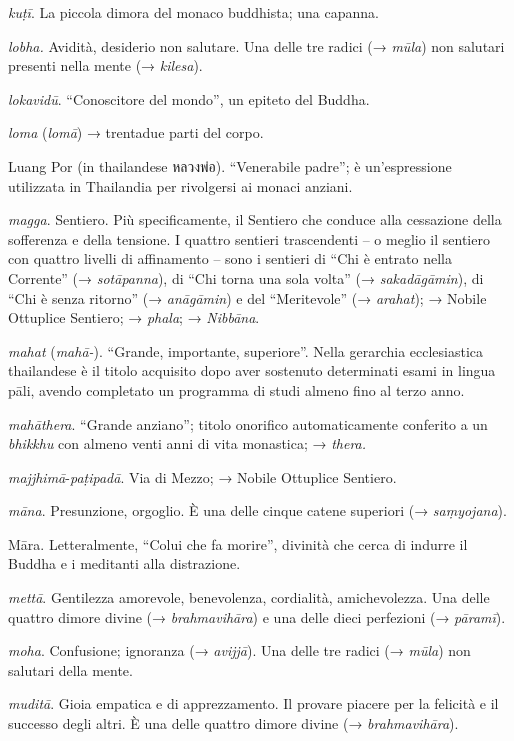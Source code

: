 \emph{kuṭī}. La piccola dimora del monaco buddhista; una capanna.

\emph{lobha.} Avidità, desiderio non salutare. Una delle tre radici (→
\emph{mūla}) non salutari presenti nella mente (→ \emph{kilesa}).

\emph{lokavidū}. ``Conoscitore del mondo'', un epiteto del Buddha.

\emph{loma} (\emph{lomā}) → trentadue parti del corpo.

Luang Por (in thailandese หลวงพ่อ). ``Venerabile padre''; è
un'espressione utilizzata in Thailandia per rivolgersi ai monaci
anziani.

\emph{magga}. Sentiero. Più specificamente, il Sentiero che conduce alla
cessazione della sofferenza e della tensione. I quattro sentieri
trascendenti -- o meglio il sentiero con quattro livelli di affinamento
-- sono i sentieri di ``Chi è entrato nella Corrente'' (→
\emph{sotāpanna}), di ``Chi torna una sola volta'' (→
\emph{sakadāgāmin}), di ``Chi è senza ritorno'' (→ \emph{anāgāmin}) e
del ``Meritevole'' (→ \emph{arahat}); → Nobile Ottuplice Sentiero; →
\emph{phala}; → \emph{Nibbāna}.

\emph{mahat} (\emph{mahā-}). ``Grande, importante, superiore''. Nella
gerarchia ecclesiastica thailandese è il titolo acquisito dopo aver
sostenuto determinati esami in lingua pāli, avendo completato un
programma di studi almeno fino al terzo anno.

\emph{mahāthera}. ``Grande anziano''; titolo onorifico automaticamente
conferito a un \emph{bhikkhu} con almeno venti anni di vita monastica; →
\emph{thera.}

\emph{majjhimā}-\emph{paṭipadā}. Via di Mezzo; → Nobile Ottuplice
Sentiero.

\emph{māna}. Presunzione, orgoglio. È una delle cinque catene superiori
(→ \emph{saṃyojana}).

Māra. Letteralmente, ``Colui che fa morire'', divinità che cerca di
indurre il Buddha e i meditanti alla distrazione.

\emph{mettā}. Gentilezza amorevole, benevolenza, cordialità,
amichevolezza. Una delle quattro dimore divine (→ \emph{brahmavihāra}) e
una delle dieci perfezioni (→ \emph{pāramī}).

\emph{moha}. Confusione; ignoranza (→ \emph{avijjā}). Una delle tre
radici (→ \emph{mūla}) non salutari della mente.

\emph{muditā}. Gioia empatica e di apprezzamento. Il provare piacere per
la felicità e il successo degli altri. È una delle quattro dimore divine
(→ \emph{brahmavihāra}).

